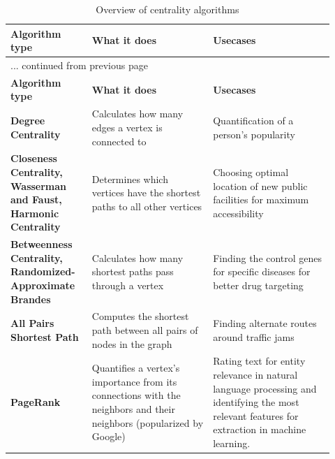 \begin{center}
	\vspace*{-0.25cm}
	\begin{longtable}{p{0.22\linewidth}p{0.3475\linewidth}p{0.3475\linewidth}}
		\hline \hline
		\textbf{Algorithm type} & \textbf{What it does} & \textbf{Usecases}\\
		\hline \hline
		\endfirsthead
		
		\multicolumn{3}{l}{... continued from previous page}\\
		\hline \hline
		\textbf{Algorithm type} & \textbf{What it does} & \textbf{Usecases}\\
		\hline \hline
		\endhead
		
		\hline
		\caption*{\tablename\ \thetable{}: \nameref*{longtable:centralityalgorithms}\sfcite{NeedhamHodler2021}. Continues on next page ...}
		\vspace*{0.5cm}
		\endfoot
		
		\hline
		\caption[Overview of centrality algorithms]{Overview of centrality algorithms\sfcite{NeedhamHodler2021}}\label{longtable:centralityalgorithms}
		\vspace*{0.5cm}
		\endlastfoot

		\textbf{Degree Centrality} & Calculates how many edges a vertex is connected to & Quantification of a person's popularity\\
		\hline
		\textbf{Closeness Centrality, Was\-ser\-man and Faust, Har\-mo\-nic Cen\-tra\-li\-ty} & Determines which vertices have the shortest paths to all other vertices & Choosing optimal location of new public facilities for maximum accessibility\\
		\hline
		\textbf{Betweenness Cen\-tra\-li\-ty, Ran\-do\-mi\-zed-Ap\-pro\-xi\-ma\-te Brandes} & Calculates how many shortest paths pass through a vertex & Finding the control genes for specific diseases for better drug targeting\\
		\hline
		\textbf{All Pairs Shortest Path} & Computes the shortest path between all pairs of nodes in the graph & Finding alternate routes around traffic jams\\
		\hline
		\textbf{PageRank} & Quantifies a vertex's importance from its connections with the neighbors and their neighbors (popularized by \gls{Google}) & Rating text for entity relevance in natural language processing and identifying the most relevant features for extraction in machine learning.\\
		\hline
	\end{longtable}
	\vspace*{-1.35cm}
\end{center}

